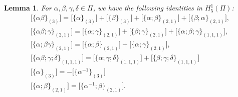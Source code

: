 \documentclass[10pt,a4paper]{amsart}
\numberwithin{equation}{section}
\newtheorem{Lemma}[Theorem]{Lemma}
\begin{document}
\begin{Lemma}
 For $\alpha, \beta, \gamma,\delta \in \Pi$, we have the following identities in $H_{5}^1(\Pi)$:
 \begin{gather*}
 \big[\{\alpha\beta\}_{(3)} \big]=\big[\{\alpha\}_{(3)}\big]+\big[\{\beta\}_{(3)}\big]+\big[\{\alpha;\beta\}_{(2,1)}\big]+\big[\{\beta;\alpha\}_{(2,1)}\big],\\
 \big[\{\alpha\beta;\gamma\}_{(2,1)}\big]=\big[\{\alpha;\gamma\}_{(2,1)}\big]+\big[\{\beta;\gamma\}_{(2,1)}\big]+\big[\{\alpha;\beta;\gamma\}_{(1,1,1)} \big],\\
 \big[\{\alpha;\beta\gamma\}_{(2,1)}\big]=\big[\{\alpha;\beta\}_{(2,1)}\big]+\big[\{\alpha;\gamma\}_{(2,1)}\big], \\
 \big[\{\alpha\beta;\gamma;\delta\}_{(1,1,1)}\big]= \big[\{\alpha;\gamma;\delta\}_{(1,1,1)}\big]+\big[\{\beta;\gamma;\delta\}_{(1,1,1)}\big]\\
 \big[\{\alpha\}_{(3)}\big]=-\big[\big\{\alpha^{-1}\big\}_{(3)}\big]\\
 \big[\{\alpha;\beta\}_{(2,1)}\big]=\big[\big\{\alpha^{-1};\beta\big\}_{(2,1)}\big].
 \end{gather*}
\end{Lemma}
\end{document}
